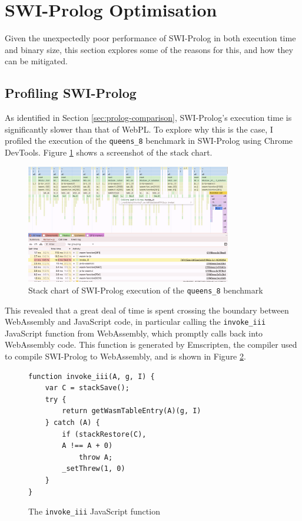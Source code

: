 \section{SWI-Prolog Optimisation}

\label{sec:swi-prolog-optimisation}

Given the unexpectedly poor performance of SWI-Prolog in both execution time and binary size, this section explores some of the reasons for this, and how they can be mitigated.

\subsection{Profiling SWI-Prolog}

As identified in Section \ref{sec:prolog-comparison}, SWI-Prolog's execution time is significantly slower than that of WebPL. To explore why this is the case, I profiled the execution of the \texttt{queens\_8} benchmark in SWI-Prolog using Chrome DevTools. Figure \ref{fig:swi-prolog-profile} shows a screenshot of the stack chart.

\begin{figure}[H]
\centering
\includegraphics[width=0.8\textwidth]{08evaluation_swiprofiling.png}
\caption{Stack chart of SWI-Prolog execution of the \texttt{queens\_8} benchmark}
\label{fig:swi-prolog-profile}
\end{figure}

This revealed that a great deal of time is spent crossing the boundary between WebAssembly and JavaScript code, in particular calling the \texttt{invoke\_iii} JavaScript function from WebAssembly, which promptly calls back into WebAssembly code. This function is generated by Emscripten, the compiler used to compile SWI-Prolog to WebAssembly, and is shown in Figure \ref{fig:invoke-iii}.

\begin{figure}[H]
\centering
\begin{verbatim}
function invoke_iii(A, g, I) {
    var C = stackSave();
    try {
        return getWasmTableEntry(A)(g, I)
    } catch (A) {
        if (stackRestore(C),
        A !== A + 0)
            throw A;
        _setThrew(1, 0)
    }
}
\end{verbatim}
\caption{The \texttt{invoke\_iii} JavaScript function}
\label{fig:invoke-iii}
\end{figure}

